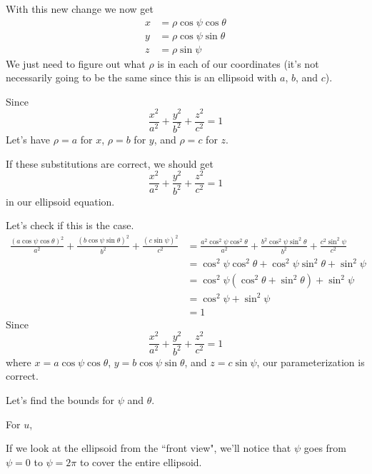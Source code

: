 \documentclass{article}
\newcommand{\lrp}[1]{\left( #1 \right)}
\begin{document}
With this new change we now get
\begin{align*}
    x&=\rho\cos\psi\cos\theta\tag{now, $r=\rho\cos\psi$}\\
    y&=\rho\cos\psi\sin\theta\tag{now, $r=\rho\cos\psi$}\\
    z&=\rho\sin\psi
\end{align*}
We just need to figure out what $\rho$ is in each of our coordinates (it's not necessarily going to be the same since this is an ellipsoid with $a$, $b$, and $c$).

Since
\begin{equation*}
    \frac{x^2}{a^2}+\frac{y^2}{b^2}+\frac{z^2}{c^2}=1
\end{equation*}
Let's have $\rho=a$ for $x$, $\rho=b$ for $y$, and $\rho =c$ for $z$.

If these substitutions are correct, we should get
\begin{equation*}
    \frac{x^2}{a^2}+\frac{y^2}{b^2}+\frac{z^2}{c^2}=1
\end{equation*}
in our ellipsoid equation.

Let's check if this is the case.
\begin{align*}
    \frac{(a\cos\psi\cos\theta)^2}{a^2}+\frac{(b\cos\psi\sin\theta)^2}{b^2}+\frac{(c\sin\psi)^2}{c^2}&=\frac{a^2\cos^2\psi\cos^2\theta}{a^2}+\frac{b^2\cos^2\psi\sin^2\theta}{b^2}+\frac{c^2\sin^2\psi}{c^2}\\
    &=\cos^2\psi\cos^2\theta+\cos^2\psi\sin^2\theta+\sin^2\psi\\
    &=\cos^2\psi\lrp{\cos^2\theta+\sin^2\theta}+\sin^2\psi\\
    &=\cos^2\psi+\sin^2\psi\tag{$\cos^2\theta+\sin^2\theta=1$}\\
    &=1\tag{$\cos^2\psi+\sin^2\psi=1$}
\end{align*}
Since 
\begin{equation*}
    \frac{x^2}{a^2}+\frac{y^2}{b^2}+\frac{z^2}{c^2}=1
\end{equation*}
where $x=a\cos\psi\cos\theta$, $y=b\cos\psi\sin\theta$, and $z=c\sin\psi$, our parameterization is correct.

Let's find the bounds for $\psi$ and $\theta$.

For $u$,

If we look at the ellipsoid from the ``front view", we'll notice that $\psi$ goes from $\psi=0$ to $\psi=2\pi$ to cover the entire ellipsoid.
\end{document}
